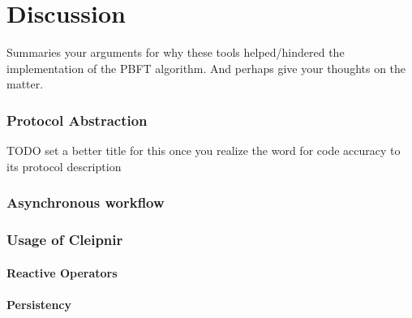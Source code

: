 \chapter{Discussion}
\label{chapter:Dis}
Summaries your arguments for why these tools helped/hindered the implementation of the PBFT algorithm. And perhaps give your thoughts on the matter.

\subsection{Protocol Abstraction}
TODO set a better title for this once you realize the word for code accuracy to its protocol description
\subsection{Asynchronous workflow}
\subsection{Usage of Cleipnir}
\subsubsection{Reactive Operators}
\subsubsection{Persistency}